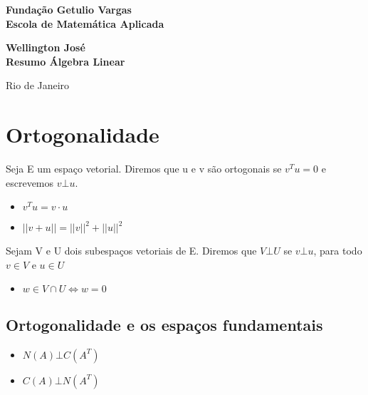 \documentclass[12pt]{article}
\begin{document}
\begin{titlepage}
\begin{center}
\textbf{\LARGE Fundação Getulio Vargas}\\ 
\textbf{\LARGE Escola de Matemática Aplicada}

\par
\vspace{170pt}
\textbf{\Large Wellington José}\\
\vspace{32pt}
\textbf{\Large Resumo Álgebra Linear}\\
\end{center}

\par
\vfill
\begin{center}
{{\normalsize Rio de Janeiro}\\
{\normalsize \the\year}}
\end{center}
\end{titlepage}

\thispagestyle{empty}

\section*{Ortogonalidade}
    Seja E um espaço vetorial. Diremos que u e v são ortogonais se $v^Tu = 0$ e escrevemos $v \bot u$.
    \begin{itemize}
        \item $v^T u = v \cdot u$
        \item $||v + u|| = ||v||^2 + ||u||^2$
    \end{itemize}
    Sejam V e U dois subespaços vetoriais de E. Diremos que $V \bot U$ se $v \bot u$, para todo $v \in V$ e $u \in U$
    
    \begin{itemize}
        \item $w \in V \cap U \iff w = 0$
    \end{itemize}

\subsection*{Ortogonalidade e os espaços fundamentais}
\begin{itemize}
    \item $N(A) \bot C(A^T)$
    \item $C(A) \bot N(A^T)$
\end{itemize}
\end{document}
